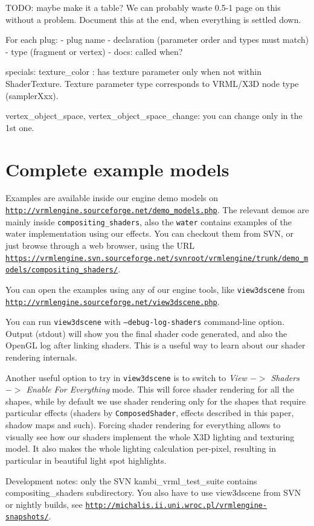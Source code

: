 \documentclass{acmsiggraph}                     %
\newcommand*{\myhref}[2]{\texttt{\href{#1}{\nolinkurl{#2}}}}
\begin{document}
TODO: maybe make it a table? We can probably waste 0.5-1 page on this
without a problem. Document this at the end, when everything is settled down.

For each plug:
- plug name
- declaration (parameter order and types must match)
- type (fragment or vertex)
- docs: called when?

specials:
texture\_color : has texture parameter only when not within ShaderTexture.
Texture parameter type corresponds to VRML/X3D node type (samplerXxx).

vertex\_object\_space, vertex\_object\_space\_change: you can change
only in the 1st one.

\section{Complete example models}

Examples are available inside our engine demo models on
\myhref{http://vrmlengine.sourceforge.net/demo\_models.php}{http://vrmlengine.sourceforge.net/demo_models.php}.
The relevant demos are mainly inside \texttt{compositing\_shaders},
also the \texttt{water} contains examples of the water implementation
using our effects.
You can checkout them from SVN, or just browse through a web browser,
using the URL
\myhref{https://vrmlengine.svn.sourceforge.net/svnroot/vrmlengine/trunk/demo\_models/compositing\_shaders/}{https://vrmlengine.svn.sourceforge.net/svnroot/vrmlengine/trunk/demo_models/compositing_shaders/}.

You can open the examples using any of our engine tools,
like \texttt{view3dscene} from
\myhref{http://vrmlengine.sourceforge.net/view3dscene.php}{http://vrmlengine.sourceforge.net/view3dscene.php}.

You can run \texttt{view3dscene} with \texttt{--debug-log-shaders} command-line
option. Output (stdout) will show you the final shader code generated,
and also the OpenGL log after linking shaders.
This is a useful way to learn about our shader rendering internals.

Another useful option to try in \texttt{view3dscene} is to switch to
\textit{View $->$ Shaders $->$ Enable For Everything} mode.
This will force shader rendering for all the shapes,
while by default we use shader rendering only for the shapes that
require particular effects (shaders by \texttt{ComposedShader}, effects
described in this paper, shadow maps and such).
Forcing shader rendering for everything allows to visually see
how our shaders implement the whole X3D lighting and texturing model.
It also makes the whole lighting calculation per-pixel, resulting
in particular in beautiful light spot highlights.

Development notes: only the SVN kambi\_vrml\_test\_suite contains
compositing\_shaders subdirectory.
You also have to use view3dscene from SVN or nightly builds,
see \myhref{http://michalis.ii.uni.wroc.pl/vrmlengine-snapshots/}{http://michalis.ii.uni.wroc.pl/vrmlengine-snapshots/}.


\nocite{*}

\end{document}
